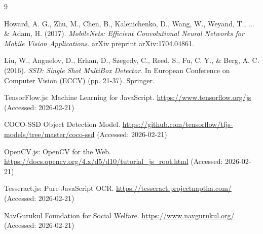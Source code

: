 \documentclass[11pt,a4paper]{article}
\begin{document}
\begin{thebibliography}{9}

Howard, A. G., Zhu, M., Chen, B., Kalenichenko, D., Wang, W., Weyand, T., ... \& Adam, H. (2017).
\textit{MobileNets: Efficient Convolutional Neural Networks for Mobile Vision Applications}.
arXiv preprint arXiv:1704.04861.

Liu, W., Anguelov, D., Erhan, D., Szegedy, C., Reed, S., Fu, C. Y., \& Berg, A. C. (2016).
\textit{SSD: Single Shot MultiBox Detector}.
In European Conference on Computer Vision (ECCV) (pp. 21-37). Springer.

TensorFlow.js: Machine Learning for JavaScript.
\url{https://www.tensorflow.org/js}
(Accessed: 2026-02-21)

COCO-SSD Object Detection Model.
\url{https://github.com/tensorflow/tfjs-models/tree/master/coco-ssd}
(Accessed: 2026-02-21)

OpenCV.js: OpenCV for the Web.
\url{https://docs.opencv.org/4.x/d5/d10/tutorial_js_root.html}
(Accessed: 2026-02-21)

Tesseract.js: Pure JavaScript OCR.
\url{https://tesseract.projectnaptha.com/}
(Accessed: 2026-02-21)

NavGurukul Foundation for Social Welfare.
\url{https://www.navgurukul.org/}
(Accessed: 2026-02-21)

\end{thebibliography}
\end{document}
